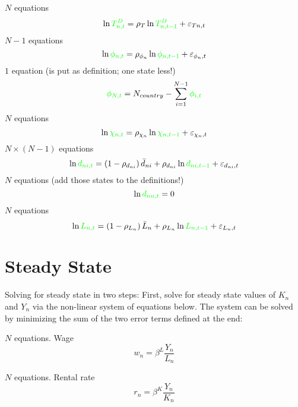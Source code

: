 \documentclass[11pt]{article}
\newcommand{\st}[1]{{\color{green}{#1}}}
\begin{document}
\noindent $N$ equations
\begin{equation}
\ln \st{T^D_{n,t}} = \rho_T \ln  \st{T^D_{n,t-1}} + \varepsilon_{Tn,t}    
\end{equation}
\noindent $N-1$ equations
\begin{equation}
\ln \st{\phi_{n,t}} = \rho_{\phi_n} \ln  \st{\phi_{n,t-1}} + \varepsilon_{\phi_n,t}  
\end{equation}
\noindent $1$ equation (is put as definition; one state less!)
\begin{equation}
\st{\phi_{N,t}} = N_{country} - \sum_{i=1}^{N-1} \st{\phi_{i,t}}
\end{equation}
\noindent $N$ equations
\begin{equation}
\ln \st{\chi_{n,t}} = \rho_{\chi_n} \ln  \st{\chi_{n,t-1}} + \varepsilon_{\chi_n,t}    
\end{equation}
\noindent $N \times (N-1)$ equations
\begin{equation}
\ln \st{d_{ni,t}} = \left(1 - \rho_{d_{ni}} \right) \bar{d}_{ni} + \rho_{d_{ni}} \ln  \st{d_{ni,t-1}} + \varepsilon_{d_{ni},t}    
\end{equation}
\noindent $N$ equations (add those states to the definitions!)
\begin{equation}
\ln \st{d_{nn,t}} = 0  
\end{equation}
\noindent $N$ equations
\begin{equation}
\ln \st{L_{n,t}} = \left(1 - \rho_{L_{n}} \right) \bar{L}_{n} + \rho_{L_{n}} \ln  \st{L_{n,t-1}} + \varepsilon_{L_{n},t}    
\end{equation}


\section{Steady State}

Solving for steady state in two steps: First, solve for steady state values of $K_n$ and $Y_n$ via the non-linear system of equations below. The system can be solved by minimizing the sum of the two error terms defined at the end:

\noindent $N$ equations. Wage
\begin{equation}
w_{n} = \beta^L \frac{Y_{n}}{L_{n}}
\end{equation}

\noindent $N$ equations. Rental rate
\begin{equation}
 r_{n} = \beta^K \frac{Y_{n}}{K_{n}}
\end{equation}
\end{document}
